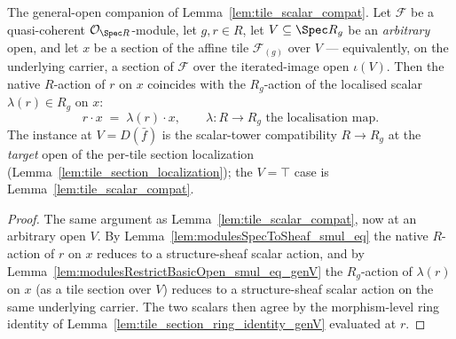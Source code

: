 \begin{lemma}

  \label{lem:tile_scalar_compat_genV}
  The general-open companion of Lemma~\ref{lem:tile_scalar_compat}. Let \(\mathcal{F}\) be a
  quasi-coherent \(\mathcal{O}_{\Spec R}\)-module, let \(g, r \in R\), let \(V \subseteq \Spec R_g\) be
  an \emph{arbitrary} open, and let \(x\) be a section of the affine tile \(\mathcal{F}_{(g)}\) over
  \(V\) --- equivalently, on the underlying carrier, a section of \(\mathcal{F}\) over the
  iterated-image open \(\iota(V)\). Then the native \(R\)-action of \(r\) on \(x\) coincides with the
  \(R_g\)-action of the localised scalar \(\lambda(r) \in R_g\) on \(x\):
  \[
    r \cdot x \;=\; \lambda(r) \cdot x,
    \qquad \lambda : R \to R_g \text{ the localisation map}.
  \]
  The instance at \(V = D(\bar f)\) is the scalar-tower compatibility \(R \to R_g\) at the \emph{target}
  open of the per-tile section localization (Lemma~\ref{lem:tile_section_localization}); the
  \(V = \top\) case is Lemma~\ref{lem:tile_scalar_compat}.
\end{lemma}
\begin{proof}
    \leanok
  The same argument as Lemma~\ref{lem:tile_scalar_compat}, now at an arbitrary open \(V\). By
  Lemma~\ref{lem:modulesSpecToSheaf_smul_eq} the native \(R\)-action of \(r\) on \(x\) reduces to a
  structure-sheaf scalar action, and by Lemma~\ref{lem:modulesRestrictBasicOpen_smul_eq_genV} the
  \(R_g\)-action of \(\lambda(r)\) on \(x\) (as a tile section over \(V\)) reduces to a structure-sheaf
  scalar action on the same underlying carrier. The two scalars then agree by the morphism-level ring
  identity of Lemma~\ref{lem:tile_section_ring_identity_genV} evaluated at \(r\).
\end{proof}

